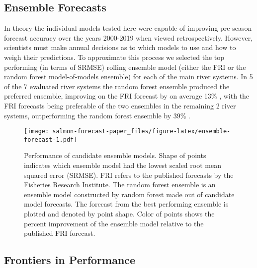 \documentclass[
]{article}
\begin{document}
\hypertarget{ensemble-forecasts}{%
\subsection*{Ensemble Forecasts}\label{ensemble-forecasts}}

In theory the individual models tested here were capable of improving pre-season forecast accuracy over the years 2000-2019 when viewed retrospectively. However, scientists must make annual decisions as to which models to use and how to weigh their predictions. To approximate this process we selected the top performing (in terms of SRMSE) rolling ensemble model (either the FRI or the random forest model-of-models ensemble) for each of the main river systems. In 5 of the 7 evaluated river systems the random forest ensemble produced the preferred ensemble, improving on the FRI forecast by on average 13\% , with the FRI forecasts being preferable of the two ensembles in the remaining 2 river systems, outperforming the random forest ensemble by 39\% .

\begin{figure}
\centering
\texttt{[image: salmon-forecast-paper\_files/figure-latex/ensemble-forecast-1.pdf]}
\caption{\label{fig:ensemble-forecast}Performance of candidate ensemble models. Shape of points indicates which ensemble model had the lowest scaled root mean squared error (SRMSE). FRI refers to the published forecasts by the Fisheries Research Institute. The random forest ensemble is an ensemble model constructed by random forest made out of candidate model forecasts. The forecast from the best performing ensemble is plotted and denoted by point shape. Color of points shows the percent improvement of the ensemble model relative to the published FRI forecast.}
\end{figure}

\hypertarget{frontiers-in-performance}{%
\subsection*{Frontiers in Performance}\label{frontiers-in-performance}}
\end{document}
